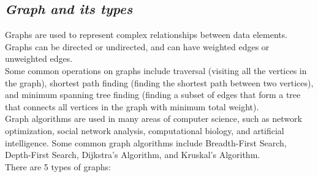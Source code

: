 \documentclass{article}
\begin{document}
\subsection{\textit{Graph and its types}}
Graphs are used to represent complex relationships between data elements. Graphs can be directed or undirected, and can have weighted edges or unweighted edges.\\
Some common operations on graphs include traversal (visiting all the vertices in the graph), shortest path finding (finding the shortest path between two vertices), and minimum spanning tree finding (finding a subset of edges that form a tree that connects all vertices in the graph with minimum total weight).\\
Graph algorithms are used in many areas of computer science, such as network optimization, social network analysis, computational biology, and artificial intelligence. Some common graph algorithms include Breadth-First Search, Depth-First Search, Dijkstra's Algorithm, and Kruskal's Algorithm.\\
There are 5 types of graphs:
\end{document}
